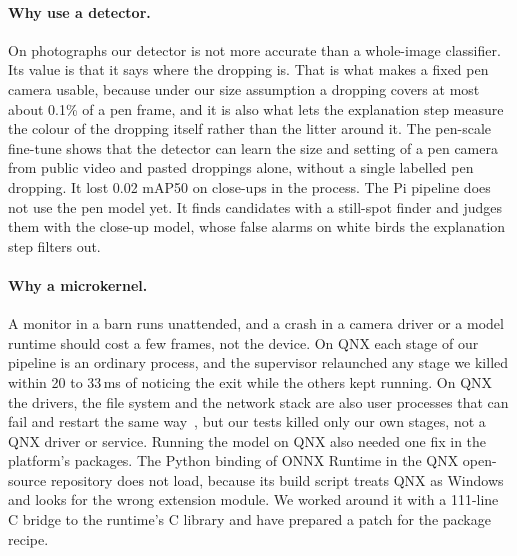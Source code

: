 \documentclass[10pt,twocolumn]{article}
\begin{document}
\paragraph{Why use a detector.} On photographs our detector is not more accurate than a whole-image classifier. Its
value is that it says where the dropping is. That is what makes a fixed pen camera usable, because under our size
assumption a dropping covers at most about 0.1\% of a pen frame, and it is also what lets the explanation step
measure the colour of the dropping itself rather than the litter around it. The pen-scale fine-tune shows that the
detector can learn the size and setting of a pen camera from public video and pasted droppings alone, without a
single labelled pen dropping. It lost 0.02 mAP50 on close-ups in the process. The Pi pipeline does not use the pen model yet. It finds candidates with a still-spot finder and judges them with the close-up model, whose false
alarms on white birds the explanation step filters out.

\paragraph{Why a microkernel.} A monitor in a barn runs unattended, and a crash in a camera driver or a model runtime
should cost a few frames, not the device. On QNX each stage of our pipeline is an ordinary process, and the
supervisor relaunched any stage we killed within 20 to 33\,ms of noticing the exit while the others kept running. On QNX the drivers, the file system and the network stack are also user processes that can fail and restart the same way~\cite{qnx8sysarch}, but our tests killed only our own stages, not a QNX driver or service. Running the model on QNX also needed one fix in the platform's
packages. The Python binding of ONNX Runtime in the QNX open-source repository does not load, because its build
script treats QNX as Windows and looks for the wrong extension module. We worked around it with a 111-line C bridge
to the runtime's C library and have prepared a patch for the package recipe.
\end{document}
